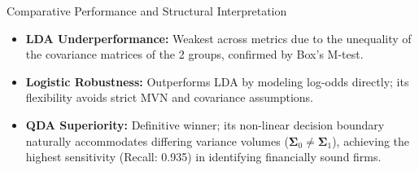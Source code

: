 \documentclass[8pt, aspectratio=169]{beamer}
\begin{document}
\begin{frame}{Comparative Performance and Structural Interpretation}
    \begin{table}
        \centering
    \end{table}

    \vspace{0.2cm}
    \begin{itemize}
        \item \textbf{LDA Underperformance:} Weakest across metrics due to the unequality of the covariance matrices of the 2 groups, confirmed by Box's M-test.
        \item \textbf{Logistic Robustness:} Outperforms LDA by modeling log-odds directly; its flexibility avoids strict MVN and covariance assumptions.
        \item \textbf{QDA Superiority:} Definitive winner; its non-linear decision boundary naturally accommodates differing variance volumes ($\boldsymbol{\Sigma}_0 \neq \boldsymbol{\Sigma}_1$), achieving the highest sensitivity (Recall: 0.935) in identifying financially sound firms.
    \end{itemize}
\end{frame}
\end{document}
